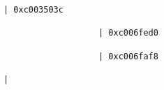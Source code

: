 \begin{lstlisting}[caption=20 viiteparametria Java$\to$C , label=profile:J2CBenchmark00206, numberbychapter=true, frame=lines, float, floatplacement=t]
                   | 0xc003503c

                   | 0xc006fed0

                   | 0xc006faf8

| 



\end{lstlisting}

